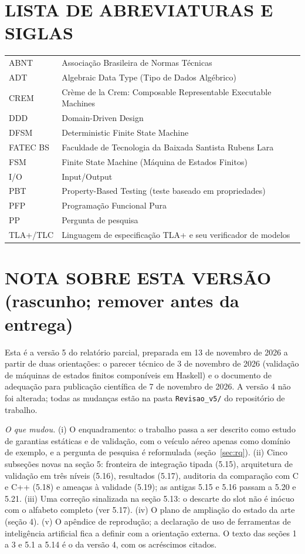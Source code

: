 \documentclass[12pt,a4paper]{article}
\begin{document}
\newpage
\section*{LISTA DE ABREVIATURAS E SIGLAS}

\begin{tabular}{ll}
ABNT & Associação Brasileira de Normas Técnicas\\
ADT & Algebraic Data Type (Tipo de Dados Algébrico)\\
CREM & Crème de la Crem: Composable Representable Executable Machines\\
DDD & Domain-Driven Design\\
DFSM & Deterministic Finite State Machine\\
FATEC BS & Faculdade de Tecnologia da Baixada Santista Rubens Lara\\
FSM & Finite State Machine (Máquina de Estados Finitos)\\
I/O & Input/Output\\
PBT & Property-Based Testing (teste baseado em propriedades)\\
PFP & Programação Funcional Pura\\
PP & Pergunta de pesquisa\\
TLA+/TLC & Linguagem de especificação TLA+ e seu verificador de modelos\\
\end{tabular}

\newpage
\section*{NOTA SOBRE ESTA VERSÃO (rascunho; remover antes da entrega)}

Esta é a versão 5 do relatório parcial, preparada em 13 de novembro de 2026 a partir de duas orientações: o parecer técnico de 3 de novembro de 2026 (validação de máquinas de estados finitos componíveis em Haskell) e o documento de adequação para publicação científica de 7 de novembro de 2026. A versão 4 não foi alterada; todas as mudanças estão na pasta \texttt{Revisao\_v5/} do repositório de trabalho.

\textit{O que mudou.} (i) O enquadramento: o trabalho passa a ser descrito como estudo de garantias estáticas e de validação, com o veículo aéreo apenas como domínio de exemplo, e a pergunta de pesquisa é reformulada (seção~\ref{sec:rq}). (ii) Cinco subseções novas na seção 5: fronteira de integração tipada (5.15), arquitetura de validação em três níveis (5.16), resultados (5.17), auditoria da comparação com C e C++ (5.18) e ameaças à validade (5.19); as antigas 5.15 e 5.16 passam a 5.20 e 5.21. (iii) Uma correção sinalizada na seção 5.13: o descarte do slot não é inócuo com o alfabeto completo (ver 5.17). (iv) O plano de ampliação do estado da arte (seção 4). (v) O apêndice de reprodução; a declaração de uso de ferramentas de inteligência artificial fica a definir com a orientação externa. O texto das seções 1 a 3 e 5.1 a 5.14 é o da versão 4, com os acréscimos citados.
\end{document}
